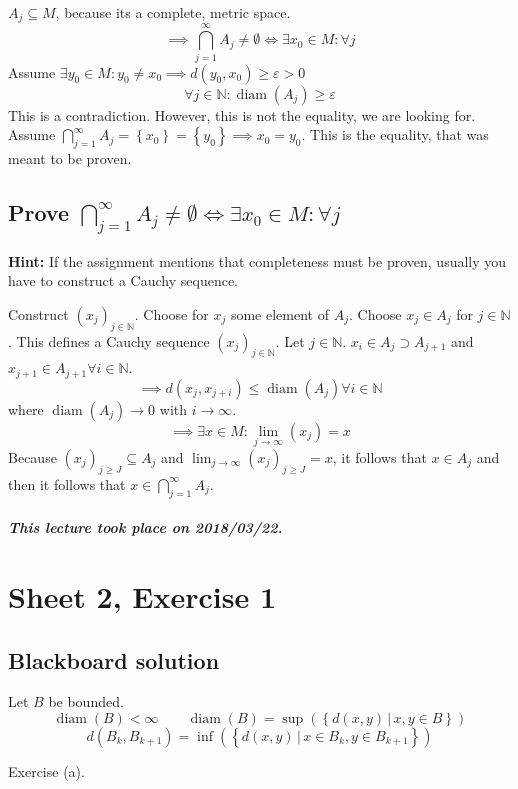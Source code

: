 \documentclass{article}
\newcommand{\set}[1]{\left\{#1\right\}}
\newcommand{\setdef}[2]{\left\{\left.#1\,\right|\,#2\right\}}
\newcommand{\dateref}[1]{\paragraph{\textit{This lecture took place on #1.}}}
\begin{document}
$A_j \subseteq M$, because its a complete, metric space.
\[ \implies \bigcap_{j=1}^\infty A_j \neq \emptyset \iff \exists x_0 \in M: \forall j \]
Assume $\exists y_0 \in M: y_0 \neq x_0 \implies d(y_0, x_0) \geq \varepsilon > 0$
\[ \forall j \in \mathbb N: \operatorname{diam}(A_j) \geq \varepsilon \]
This is a contradiction.
However, this is not the equality, we are looking for.
Assume $\bigcap_{j=1}^\infty A_j = \set{x_0} = \set{y_0} \implies x_0 = y_0$.
This is the equality, that was meant to be proven.

\subsection{Prove $\bigcap_{j=1}^\infty A_j \neq \emptyset \iff \exists x_0 \in M: \forall j$}

\textbf{Hint:} If the assignment mentions that completeness must be proven, usually you have to construct a Cauchy sequence.

Construct $(x_j)_{j \in \mathbb N}$. Choose for $x_j$ some element of $A_j$.
Choose $x_j \in A_j$ for $j \in \mathbb N$.
This defines a Cauchy sequence $(x_j)_{j \in \mathbb N}$.
Let $j \in \mathbb N$.
$x_i \in A_j \supset A_{j+1}$ and $x_{j+1} \in A_{j+1} \forall i \in \mathbb N$.
\[ \implies d(x_j, x_{j+i}) \leq \operatorname{diam}(A_j) \forall i \in \mathbb N \]
where $\operatorname{diam}(A_j) \to 0$ with $i \to \infty$.
\[ \implies \exists x \in M: \lim_{j \to \infty}(x_j) = x \]
Because $(x_j)_{j\geq J} \subseteq A_j$ and $\lim_{j\to\infty} (x_j)_{j\geq J} = x$,
it follows that $x \in A_j$ and then it follows that $x \in \bigcap_{j=1}^\infty A_j$.

\dateref{2018/03/22}

\section{Sheet 2, Exercise 1}

\subsection{Blackboard solution}

Let $B$ be bounded.
\[ \operatorname{diam}(B) < \infty \qquad \operatorname{diam}(B) = \operatorname{sup}(\setdef{d(x,y)}{x,y \in B}) \]
\[ d(B_k, B_{k+1}) = \operatorname{inf}(\setdef{d(x,y)}{x \in B_k, y \in B_{k+1}}) \]

Exercise (a).
\end{document}
